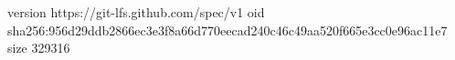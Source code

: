 version https://git-lfs.github.com/spec/v1
oid sha256:956d29ddb2866ec3e3f8a66d770eecad240c46c49aa520f665e3cc0e96ac11e7
size 329316
